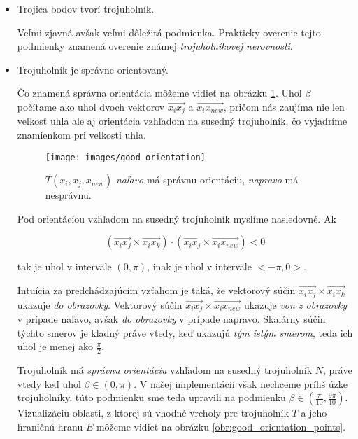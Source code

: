 \begin{itemize}
    \item{
        Trojica bodov tvorí trojuholník.


        Veľmi zjavná avšak veľmi dôležitá podmienka. Prakticky overenie tejto podmienky znamená overenie
        známej \textit{trojuholníkovej nerovnosti}.  
    } 

    \item{
        Trojuholník je správne orientovaný.


        Čo znamená správna orientácia môžeme vidieť na obrázku \ref{obr:good_orientation}. Uhol $\beta$
        počítame ako uhol dvoch vektorov $\overrightarrow{x_i x_j}$ a $\overrightarrow{x_i x_{new}}$, 
        pričom nás zaujíma nie len veľkosť uhla ale aj orientácia vzhľadom na susedný trojuholník, čo 
        vyjadríme znamienkom pri veľkosti uhla. 

        \begin{figure}
            \centerline{\texttt{[image: images/good\_orientation]}}
            \caption[]{$T(x_i, x_j, x_{new})$ \textit{naľavo} má správnu orientáciu, \textit{napravo} má nesprávnu.}
            \label{obr:good_orientation}
        \end{figure}

        Pod orientáciou vzhľadom na susedný trojuholník myslíme nasledovné.
        Ak

        $$(\overrightarrow{x_i x_j} \times \overrightarrow{x_i x_k}) 
        \cdot (\overrightarrow{x_i x_j} \times \overrightarrow{x_i x_{new}}) < 0$$

        tak je uhol v intervale $(0, \pi)$, inak je uhol v intervale $<-\pi, 0>$.
        
        Intuícia za predchádzajúcim vzťahom je taká, že vektorový súčin 
        $\overrightarrow{x_i x_j} \times \overrightarrow{x_i x_k}$ ukazuje \textit{do obrazovky}.
        Vektorový súčin $\overrightarrow{x_i x_j} \times \overrightarrow{x_i x_{new}}$ ukazuje 
        \textit{von z obrazovky} v prípade naľavo, avšak \textit{do obrazovky} v prípade napravo.
        Skalárny súčin týchto smerov je kladný práve vtedy, keď ukazujú \textit{tým istým smerom}, 
        teda ich uhol je menej ako $\frac{\pi}{2}$. 
        
        Trojuholník má \textit{správnu orientáciu} vzhľadom
        na susedný trojuholník $N$, práve vtedy keď uhol $\beta \in (0, \pi)$. V našej implementácii 
        však nechceme príliš úzke trojuholníky, túto podmienku sme teda upravili na podmienku
        $\beta \in (\frac{\pi}{10}, \frac{9\pi}{10})$. Vizualizáciu oblasti, z ktorej sú vhodné 
        vrcholy pre trojuholník $T$ a jeho hraničnú hranu $E$ môžeme vidieť na obrázku 
        \ref{obr:good_orientation_points}.

}
\end{itemize}

